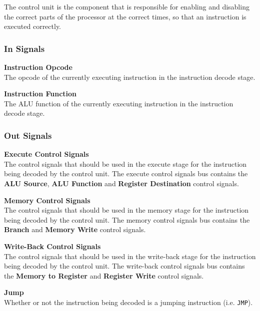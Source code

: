 The control unit is the component that is responsible for enabling and disabling the correct parts of the processor at the correct times, so that an instruction is executed correctly.

\subsubsection{In Signals}

\begin{description}
\item{\textbf{Instruction Opcode}} \\
    The opcode of the currently executing instruction in the instruction decode stage.

\item{\textbf{Instruction Function}} \\
    The ALU function of the currently executing instruction in the instruction decode stage. 
\end{description}

\subsubsection{Out Signals}

\begin{description}
\item{\textbf{Execute Control Signals}} \\
    The control signals that should be used in the execute stage for the instruction being decoded by the control unit.
    The execute control signals bus contains the \textbf{ALU Source}, \textbf{ALU Function} and \textbf{Register Destination} control signals.

\item{\textbf{Memory Control Signals}} \\
    The control signals that should be used in the memory stage for the instruction being decoded by the control unit.
    The memory control signals bus contains the \textbf{Branch} and \textbf{Memory Write} control signals.

\item{\textbf{Write-Back Control Signals}} \\
    The control signals that should be used in the write-back stage for the instruction being decoded by the control unit.
The write-back control signals bus contains the \textbf{Memory to Register} and \textbf{Register Write} control signals.

\item{\textbf{Jump}} \\
    Whether or not the instruction being decoded is a jumping instruction (i.e. \texttt{JMP}).
\end{description}

